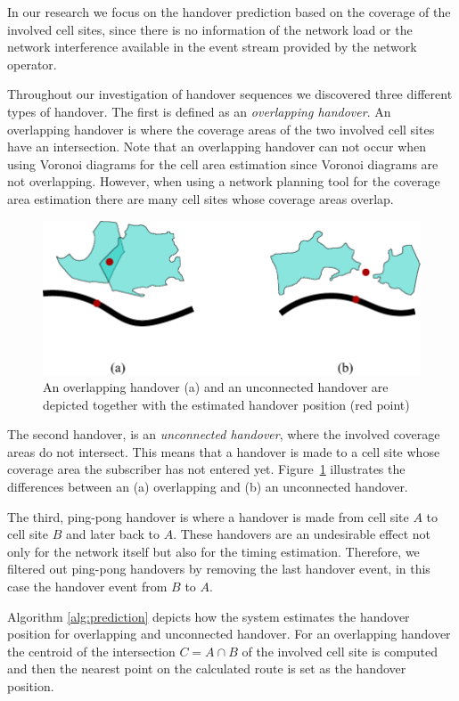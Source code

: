 In our research we focus on the handover prediction based on the coverage of the involved cell sites, since there is no information of the network load or the network interference available in the event stream provided by the network operator.

Throughout our investigation of handover sequences we discovered three different types of handover. The first is defined as an \emph{overlapping handover}. 
An overlapping handover is where the coverage areas of the two involved cell sites have an intersection. Note that an overlapping handover can not occur when using Voronoi diagrams for the cell area estimation since Voronoi diagrams are not overlapping. However, when using a network planning tool for the coverage area estimation there are many cell sites whose coverage areas overlap. 

\begin{figure}[h!]
		\label{fig:handover}
		\caption{ An overlapping handover (a) and an unconnected handover are depicted together with the estimated handover position (red point)
		}
		\includegraphics[width=0.9\columnwidth]{handover}
	\end{figure}

The second handover, is an \emph{unconnected handover}, where the involved coverage areas do not intersect. This means that a handover is made to a cell site whose coverage area the subscriber has not entered yet. Figure~\ref{fig:handover} illustrates the differences between an (a) overlapping and (b) an unconnected handover.

The third, ping-pong handover is where a handover is made from cell site $A$ to cell site $B$ and later back to $A$. These handovers are an undesirable effect not only for the network itself but also for the timing estimation. Therefore, we filtered out ping-pong handovers by removing the last handover event, in this case the handover event from $B$ to $A$.

Algorithm \ref{alg:prediction} depicts how the system estimates the handover position for overlapping and unconnected handover. For an overlapping handover the centroid of the intersection $C=A \cap B$ of the involved cell site is computed and then the nearest point on the calculated route is set as the handover position. 

